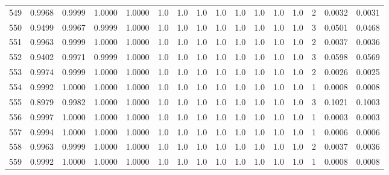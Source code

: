 \begin{tabular}{lrrrrrrrrrrrrrrr}
549 &      0.9968 &  0.9999 &  1.0000 &  1.0000 &     1.0 &     1.0 &     1.0 &     1.0 &     1.0 &     1.0 &      1.0 &        1.0 &      2 &                    0.0032 &                     0.0031 \\
550 &      0.9499 &  0.9967 &  0.9999 &  1.0000 &     1.0 &     1.0 &     1.0 &     1.0 &     1.0 &     1.0 &      1.0 &        1.0 &      3 &                    0.0501 &                     0.0468 \\
551 &      0.9963 &  0.9999 &  1.0000 &  1.0000 &     1.0 &     1.0 &     1.0 &     1.0 &     1.0 &     1.0 &      1.0 &        1.0 &      2 &                    0.0037 &                     0.0036 \\
552 &      0.9402 &  0.9971 &  0.9999 &  1.0000 &     1.0 &     1.0 &     1.0 &     1.0 &     1.0 &     1.0 &      1.0 &        1.0 &      3 &                    0.0598 &                     0.0569 \\
553 &      0.9974 &  0.9999 &  1.0000 &  1.0000 &     1.0 &     1.0 &     1.0 &     1.0 &     1.0 &     1.0 &      1.0 &        1.0 &      2 &                    0.0026 &                     0.0025 \\
554 &      0.9992 &  1.0000 &  1.0000 &  1.0000 &     1.0 &     1.0 &     1.0 &     1.0 &     1.0 &     1.0 &      1.0 &        1.0 &      1 &                    0.0008 &                     0.0008 \\
555 &      0.8979 &  0.9982 &  1.0000 &  1.0000 &     1.0 &     1.0 &     1.0 &     1.0 &     1.0 &     1.0 &      1.0 &        1.0 &      3 &                    0.1021 &                     0.1003 \\
556 &      0.9997 &  1.0000 &  1.0000 &  1.0000 &     1.0 &     1.0 &     1.0 &     1.0 &     1.0 &     1.0 &      1.0 &        1.0 &      1 &                    0.0003 &                     0.0003 \\
557 &      0.9994 &  1.0000 &  1.0000 &  1.0000 &     1.0 &     1.0 &     1.0 &     1.0 &     1.0 &     1.0 &      1.0 &        1.0 &      1 &                    0.0006 &                     0.0006 \\
558 &      0.9963 &  0.9999 &  1.0000 &  1.0000 &     1.0 &     1.0 &     1.0 &     1.0 &     1.0 &     1.0 &      1.0 &        1.0 &      2 &                    0.0037 &                     0.0036 \\
559 &      0.9992 &  1.0000 &  1.0000 &  1.0000 &     1.0 &     1.0 &     1.0 &     1.0 &     1.0 &     1.0 &      1.0 &        1.0 &      1 &                    0.0008 &                     0.0008 \\

\end{tabular}
